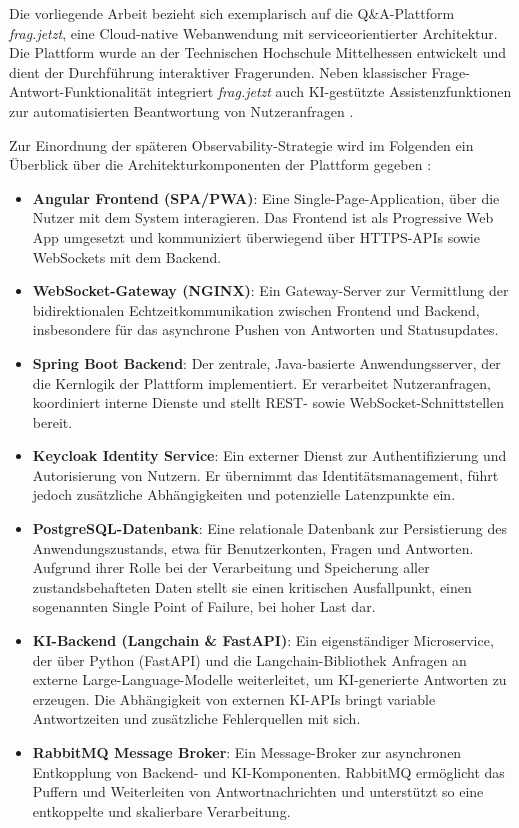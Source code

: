 Die vorliegende Arbeit bezieht sich exemplarisch auf die Q\&A-Plattform \textit{frag.jetzt}, eine Cloud-native Webanwendung mit serviceorientierter Architektur. Die Plattform wurde an der Technischen Hochschule Mittelhessen entwickelt und dient der Durchführung interaktiver Fragerunden. Neben klassischer Frage-Antwort-Funktionalität integriert \textit{frag.jetzt} auch KI-gestützte Assistenzfunktionen zur automatisierten Beantwortung von Nutzeranfragen \cite{fragjetztRepo}.

Zur Einordnung der späteren Observability-Strategie wird im Folgenden ein Überblick über die Architekturkomponenten der Plattform gegeben \cite{fragjetztRepo}:

\begin{itemize}
\item \textbf{Angular Frontend (SPA/PWA)}: Eine Single-Page-Application, über die Nutzer mit dem System interagieren. Das Frontend ist als Progressive Web App umgesetzt und kommuniziert überwiegend über HTTPS-APIs sowie WebSockets mit dem Backend.
\item \textbf{WebSocket-Gateway (NGINX)}: Ein Gateway-Server zur Vermittlung der bidirektionalen Echtzeitkommunikation zwischen Frontend und Backend, insbesondere für das asynchrone Pushen von Antworten und Statusupdates.
\item \textbf{Spring Boot Backend}: Der zentrale, Java-basierte Anwendungsserver, der die Kernlogik der Plattform implementiert. Er verarbeitet Nutzeranfragen, koordiniert interne Dienste und stellt REST- sowie WebSocket-Schnittstellen bereit.
\item \textbf{Keycloak Identity Service}: Ein externer Dienst zur Authentifizierung und Autorisierung von Nutzern. Er übernimmt das Identitätsmanagement, führt jedoch zusätzliche Abhängigkeiten und potenzielle Latenzpunkte ein.
\item \textbf{PostgreSQL-Datenbank}: Eine relationale Datenbank zur Persistierung des Anwendungszustands, etwa für Benutzerkonten, Fragen und Antworten. Aufgrund ihrer Rolle bei der Verarbeitung und Speicherung aller zustandsbehafteten Daten stellt sie einen kritischen Ausfallpunkt, einen sogenannten Single Point of Failure, bei hoher Last dar.
\item \textbf{KI-Backend (Langchain \& FastAPI)}: Ein eigenständiger Microservice, der über Python (FastAPI) und die Langchain-Bibliothek Anfragen an externe Large-Language-Modelle weiterleitet, um KI-generierte Antworten zu erzeugen. Die Abhängigkeit von externen KI-APIs bringt variable Antwortzeiten und zusätzliche Fehlerquellen mit sich.
\item \textbf{RabbitMQ Message Broker}: Ein Message-Broker zur asynchronen Entkopplung von Backend- und KI-Komponenten. RabbitMQ ermöglicht das Puffern und Weiterleiten von Antwortnachrichten und unterstützt so eine entkoppelte und skalierbare Verarbeitung.
\end{itemize}

